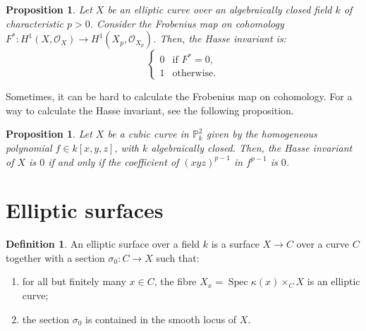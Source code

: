 \documentclass{report}
\DeclareMathOperator{\Spec}{Spec}
\newtheorem{proposition}[equation]{Proposition}
\theoremstyle{definition}
\newtheorem{definition}[equation]{Definition}
\begin{document}
\begin{proposition}
Let $X$ be an elliptic curve over an algebraically closed field $k$ of characteristic $p>0$. Consider the Frobenius map on cohomology $F^*:H^1(X,\mathcal{O}_X)\rightarrow H^1(X_p,\mathcal{O}_{X_p})$. Then, the Hasse invariant is:
\[\left\{\begin{array}{rcl}0&\text{if }F^*=0,\\1&\text{otherwise}.\end{array}\right.\]
\end{proposition}

Sometimes, it can be hard to calculate the Frobenius map on cohomology. For a way to calculate the Hasse invariant, see the following proposition.

\begin{proposition}
Let $X$ be a cubic curve in $\mathbb{P}_k^2$ given by the homogeneous polynomial $f\in k[x,y,z]$, with $k$ algebraically closed. Then, the Hasse invariant of $X$ is $0$ if and only if the coefficient of $(xyz)^{p-1}$ in $f^{p-1}$ is $0$.
\end{proposition}

\section{Elliptic surfaces}
\begin{definition}
An elliptic surface over a field $k$ is a surface $X\rightarrow C$ over a curve $C$ together with a section $\sigma_0:C\rightarrow X$ such that:
\begin{enumerate}
\item for all but finitely many $x\in C$, the fibre $X_x=\Spec\kappa(x)\times_CX$ is an elliptic curve;
\item the section $\sigma_0$ is contained in the smooth locus of $X$.
\end{enumerate}
\end{definition}
\end{document}
